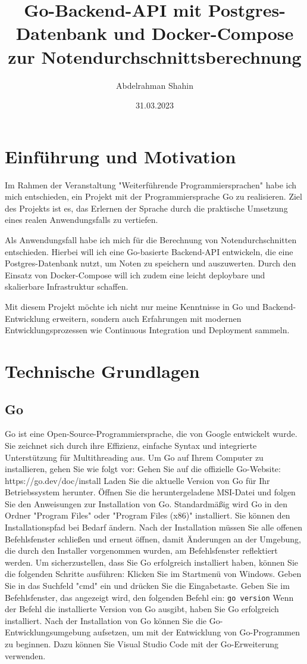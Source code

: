 \documentclass[a4paper,12pt,titlepage]{article}
\title{Go-Backend-API mit Postgres-Datenbank und Docker-Compose zur Notendurchschnittsberechnung}
\author{Abdelrahman Shahin}
\date{31.03.2023}
\begin{document}
\maketitle

\section{Einführung und Motivation}
Im Rahmen der Veranstaltung "Weiterführende Programmiersprachen" habe ich mich entschieden, ein Projekt mit der Programmiersprache Go zu realisieren. Ziel des Projekts ist es, das Erlernen der Sprache durch die praktische Umsetzung eines realen Anwendungsfalls zu vertiefen.

Als Anwendungsfall habe ich mich für die Berechnung von Notendurchschnitten entschieden. Hierbei will ich eine Go-basierte Backend-API entwickeln, die eine Postgres-Datenbank nutzt, um Noten zu speichern und auszuwerten. Durch den Einsatz von Docker-Compose will ich zudem eine leicht deploybare und skalierbare Infrastruktur schaffen.

Mit diesem Projekt möchte ich nicht nur meine Kenntnisse in Go und Backend-Entwicklung erweitern, sondern auch Erfahrungen mit modernen Entwicklungsprozessen wie Continuous Integration und Deployment sammeln.

\section{Technische Grundlagen}
\subsection{Go}
Go ist eine Open-Source-Programmiersprache, die von Google entwickelt wurde. Sie zeichnet sich durch ihre Effizienz, einfache Syntax und integrierte Unterstützung für Multithreading aus. Um Go auf Ihrem Computer zu installieren, gehen Sie wie folgt vor:
Gehen Sie auf die offizielle Go-Website: https://go.dev/doc/install
Laden Sie die aktuelle Version von Go für Ihr Betriebssystem herunter.
Öffnen Sie die heruntergeladene MSI-Datei und folgen Sie den Anweisungen zur Installation von Go. Standardmäßig wird Go in den Ordner "Program Files" oder "Program Files (x86)" installiert. Sie können den Installationspfad bei Bedarf ändern. Nach der Installation müssen Sie alle offenen Befehlsfenster schließen und erneut öffnen, damit Änderungen an der Umgebung, die durch den Installer vorgenommen wurden, am Befehlsfenster reflektiert werden.
Um sicherzustellen, dass Sie Go erfolgreich installiert haben, können Sie die folgenden Schritte ausführen:
Klicken Sie im Startmenü von Windows.
Geben Sie in das Suchfeld "cmd" ein und drücken Sie die Eingabetaste.
Geben Sie im Befehlsfenster, das angezeigt wird, den folgenden Befehl ein:
\texttt{go version}
Wenn der Befehl die installierte Version von Go ausgibt, haben Sie Go erfolgreich installiert.
Nach der Installation von Go können Sie die Go-Entwicklungsumgebung aufsetzen, um mit der Entwicklung von Go-Programmen zu beginnen. Dazu können Sie Visual Studio Code mit der Go-Erweiterung verwenden.
\end{document}
